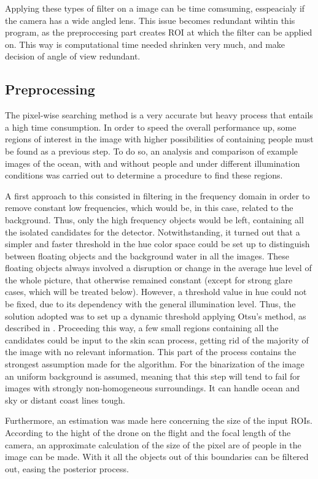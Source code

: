 Applying these types of filter on a image can be time comsuming, esspeacialy if the camera has a wide angled lens. This issue becomes redundant wihtin this program, as the preproccesing part creates ROI at which the filter can be applied on.   This way is computational time needed shrinken very much,  and make decision of angle of view redundant. \\


\subsection{Preprocessing}
The pixel-wise searching method is a very accurate but heavy process that entails a high time consumption.
In order to speed the overall performance up, some regions of interest in the image with higher possibilities of containing people must be found as a previous step. 
To do so, an analysis and comparison of example images of the ocean, with and without people and under different illumination conditions was carried out to determine a procedure to find these regions.

A first approach to this consisted in filtering in the frequency domain in order to remove constant low frequencies, which would be, in this case, related to the background. Thus, only the high frequency objects would be left, containing all the isolated candidates for the detector.
Notwithstanding, it turned out that a simpler and faster threshold in the hue color space could be set up to distinguish between floating objects and the background water in all the images. 
These floating objects always involved a disruption or change in the average hue level of the whole picture, that otherwise remained constant (except for strong glare cases, which will be treated below).
However, a threshold value in hue could not be fixed, due to its dependency with the general illumination level. 
Thus, the solution adopted was to set up a dynamic threshold applying Otsu's method, as described in \cite{Ref:Otsu}.
Proceeding this way, a few small regions containing all the candidates could be input to the skin scan process, getting rid of the majority of the image with no relevant information. 
This part of the process contains the strongest assumption made for the algorithm. 
For the binarization of the image an uniform background is assumed, meaning that this step will tend to fail for images with strongly non-homogeneous surroundings. 
It can handle ocean and sky or distant coast lines tough. 

Furthermore, an estimation was made here concerning the size of the input ROIs. 
According to the hight of the drone on the flight and the focal length of the camera, an approximate calculation of the size of the pixel are of people in the image can be made. 
With it all the objects out of this boundaries can be filtered out, easing the posterior process.

